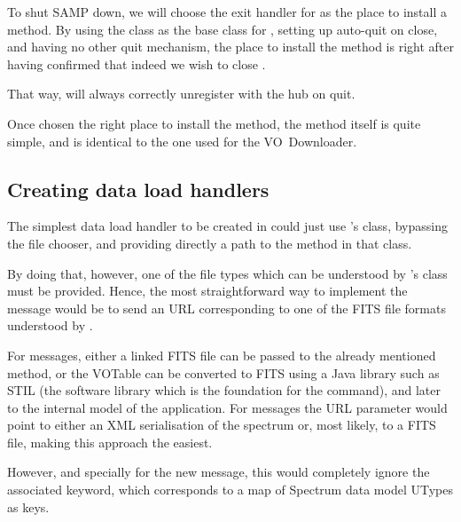 			To shut SAMP down, we will choose the exit handler
			for \massa{} as the place to install a
			\shutdownSamp{} method. By using the
			 class as the base class for
			, setting up auto-quit on close,
			and having no other quit mechanism, the place
			to install the \shutdownSamp{} method is
			right after having confirmed that indeed we wish to
			close \massa{}.
			
			That way, \massa{} will always correctly unregister
			with the hub on quit.
			
			Once chosen the right place to install the
			\shutdownSamp{} method, the method itself
			is quite simple, and is identical to the one
			used for the VO~Downloader.
			
		
		\subsection{Creating data load handlers} %
		\label{sub:creating_data_load_handlers}
			
			The simplest data load handler to be created in
			\initSamp{} could just use \massa's  class,
			bypassing the file chooser, and providing directly a
			path to the  method in that class.
			
			By doing that, however, one of the file types which
			can be understood by \massa's 
			class must be provided. Hence, the most straightforward way
			to implement the
			 message
			would be to send an URL corresponding 
			to one of the
			FITS file formats understood by \massa.
			
			For  messages, either a
			linked FITS file can be passed to the already
			mentioned  method, or the VOTable
			can be converted to FITS using a Java library
			such as STIL (the software library which is the
			foundation for the  command), and
			later to the internal model of the application.
			For  messages
			the URL parameter would point to either an XML
			serialisation of the spectrum or, most likely,
			to a FITS file, making this approach the easiest.
			
			However, and specially for the new
			 message, this
			would completely ignore the associated 
			keyword, which corresponds to a map of Spectrum data
			model UTypes as keys.
			
